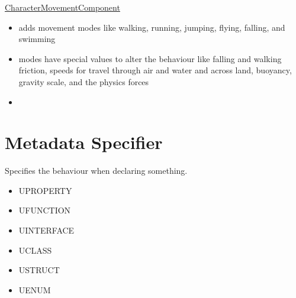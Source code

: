         \uline{CharacterMovementComponent}
            \begin{itemize}
                \item adds movement modes like walking, running, jumping, flying, falling, and swimming
                \item modes have special values to alter the behaviour like falling and walking friction, speeds for travel through air and water and across land, buoyancy, gravity scale, and the physics forces
                \item 
            \end{itemize}
        
    \section{Metadata Specifier}
        Specifies the behaviour when declaring something. \\
        \begin{itemize}
            \item UPROPERTY
            \item UFUNCTION
            \item UINTERFACE
            \item UCLASS
            \item USTRUCT
            \item UENUM
        \end{itemize}

